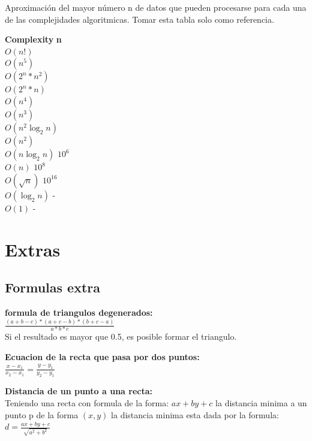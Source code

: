 \documentclass[10pt,landscape,twocolumn,a4paper,notitlepage]{article}
\begin{document}
Aproximación del mayor número n de datos que pueden procesarse para cada una de las complejidades algoritmicas. Tomar esta tabla solo como referencia.

\begin{tabbing}
\textbf{Complexity}\hspace{4cm} \=  \textbf{n}\hspace{3cm}   \\ 
$O(n!)$ \\ 
$O(n^{5})$ \\ 
$O(2^{n}*n^{2})$ \\ 
$O(2^{n}*n)$ \\ 
$O(n^{4})$ \\ 
$O(n^{3})$ \\ 
$O(n^{2}\log_{2}n)$ \\ 
$O(n^{2})$ \\ 
$O(n\log_{2}n)$ \> $10^{6}$\\ 
$O(n)$ \> $10^{8}$\\ 
$O(\sqrt{n})$ \> $10^{16}$\\ 
$O(\log_{2}n)$ \> -\\ 
$O(1)$ \> -\\ 
\end{tabbing}

	\section{Extras}
		\subsection{Formulas extra}
			\textbf{formula de triangulos degenerados:}\\
			\vspace{3mm}
			{\Large$\frac{(a + b - c) * (a + c - b) * (b  + c - a)} {a * b * c}$}
			\vspace{3mm}
			\\Si el resultado es mayor que 0.5, es posible formar el triangulo.
	
			\vspace{8mm}
			\textbf{Ecuacion de la recta que pasa por dos puntos:}\\
			\vspace{3mm}
			{\Large $\frac{x - x_{1}}{x_{2} - x_{1}} = \frac{y - y_{1}}{y_{2} - y_{1}}$}

			\vspace{8mm}
			\textbf{Distancia de un punto a una recta:}\\
			Teniendo una recta con formula de la forma: $ax + by + c$ la distancia minima
			a un punto p de la forma $(x, y)$ la distancia minima esta dada por la formula:\\
			\vspace{3mm}
			{\Large $d = \frac{ax + by + c}{\sqrt{a^{2} + b^{2}}}$}
			\vspace{3mm}
			
\end{document}
